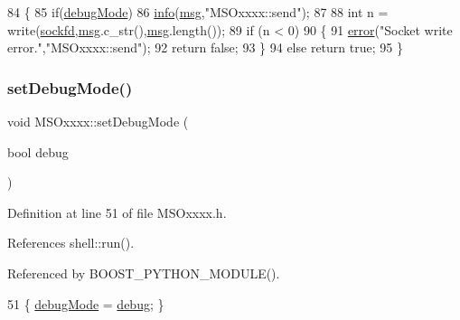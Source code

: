 \begin{DoxyCode}
84 \{
85     \textcolor{keywordflow}{if}(\hyperlink{classMSOxxxx_a826ba82e93bbe5780169107a31dbfd29}{debugMode})
86         \hyperlink{classObject_a644fd329ea4cb85f54fa6846484b84a8}{info}(\hyperlink{classObject_a58b2d0618c2d08cf2383012611528d97}{msg},\textcolor{stringliteral}{"MSOxxxx::send"});
87 
88     \textcolor{keywordtype}{int} n = write(\hyperlink{classMSOxxxx_acf030a8f1ddd78d632816c856f50455c}{sockfd},\hyperlink{classObject_a58b2d0618c2d08cf2383012611528d97}{msg}.c\_str(),\hyperlink{classObject_a58b2d0618c2d08cf2383012611528d97}{msg}.length());
89     \textcolor{keywordflow}{if} (n < 0)
90     \{
91         \hyperlink{classObject_a204a95f57818c0f811933917a30eff45}{error}(\textcolor{stringliteral}{"Socket write error."},\textcolor{stringliteral}{"MSOxxxx::send"});
92         \textcolor{keywordflow}{return} \textcolor{keyword}{false};
93     \}
94     \textcolor{keywordflow}{else} \textcolor{keywordflow}{return} \textcolor{keyword}{true};
95 \}
\end{DoxyCode}
\mbox{\label{classMSOxxxx_a59a1d5e5f537086590b60a93d5c4c8a1}} 
\subsubsection{\texorpdfstring{set\+Debug\+Mode()}{setDebugMode()}}
{\footnotesize\ttfamily void M\+S\+Oxxxx\+::set\+Debug\+Mode (\begin{DoxyParamCaption}\item[{bool}]{debug }\end{DoxyParamCaption})\hspace{0.3cm}{\ttfamily [inline]}}



Definition at line 51 of file M\+S\+Oxxxx.\+h.



References shell\+::run().



Referenced by B\+O\+O\+S\+T\+\_\+\+P\+Y\+T\+H\+O\+N\+\_\+\+M\+O\+D\+U\+L\+E().


\begin{DoxyCode}
51 \{       \hyperlink{classMSOxxxx_a826ba82e93bbe5780169107a31dbfd29}{debugMode} = \hyperlink{classObject_aac010553f022165573714b7014a15f0d}{debug};        \}
\end{DoxyCode}
\mbox{\label{classMSOxxxx_af1524bb099b5e559931704d13a1f1126}} 
